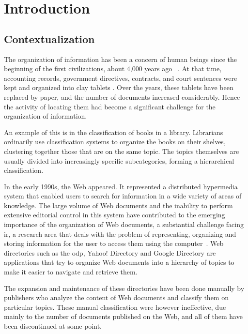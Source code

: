 \chapter{\hspace*{3pt} Introduction}
\label{chapter:intro}
\section{\hspace*{3pt}Contextualization}

The organization of information has been a concern of human beings since the beginning of the first civilizations, about 4,000 years ago ~\cite{baeza1999modern}. At that time, accounting records, government directives, contracts, and court sentences were kept and organized into clay tablets%
. Over the years, these tablets have been replaced by paper, and the number of documents increased considerably. Hence the activity of locating them had become a significant challenge for the organization of information.

An example of this is in the classification of books in a library. Librarians ordinarily use classification systems %
to organize the books on their shelves, clustering together those that are on the same topic. The topics themselves are usually divided into increasingly specific subcategories, forming a hierarchical classification. 

In the early 1990s, the Web appeared. It represented a distributed hypermedia system that enabled users to search for information in a wide variety of areas of knowledge. The large volume of Web documents and the inability to perform extensive editorial control in this system have contributed to the emerging importance of the organization of Web documents, a substantial challenge facing  \gls{ir}, a research area that deals with the problem of representing, organizing and storing information for the user to access them using the computer~\cite{baeza1999modern}. Web directories such as the \gls{odp}, Yahoo! Directory and Google Directory are applications that try to organize Web documents into a hierarchy of topics to make it easier to navigate and retrieve them. 

The expansion and maintenance of these directories have been done manually by publishers %
who analyze the content of Web documents and classify them on particular topics. These manual classification were however ineffective, due mainly to the number of documents published on the Web, and all of them have been discontinued at some point.

